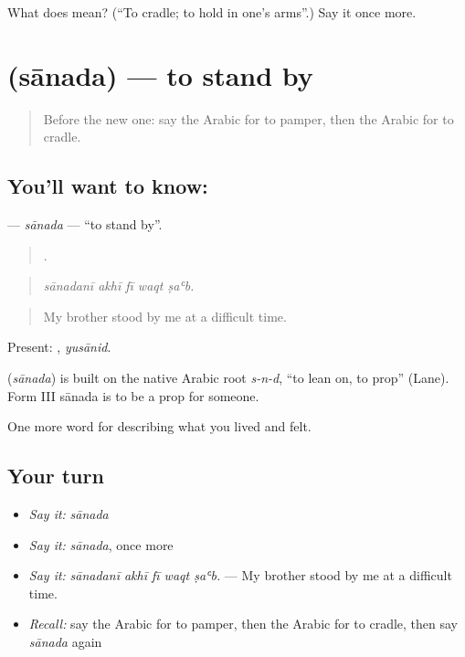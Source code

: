 \begin{tcolorbox}[breakable,colback=teal!4,colframe=teal!35!black,title={Before you move on}]
What does  mean? (\textquotedblleft{}To cradle; to hold in one's arms\textquotedblright{}.) Say it once more.
\end{tcolorbox}
\section[\texorpdfstring{\ar{ساند} (sānada)}{ساند (sānada)}]{ (sānada) — to stand by}

\label{lesson:AR-C533-sanada}



\begin{quote}
Before the new one: say the Arabic for to pamper, then the Arabic for to cradle.
\end{quote}

\subsection*{You'll want to know: }
\textbf{} — \emph{sānada} — \textquotedblleft{}to stand by\textquotedblright{}.

\begin{quote}
    .
\end{quote}

\begin{quote}
\emph{sānadanī akhī fī waqt ṣaʿb.}
\end{quote}

\begin{quote}
My brother stood by me at a difficult time.
\end{quote}

Present: , \emph{yusānid}.

\begin{cousinweb}
\textbf{} (\emph{sānada}) is built on the native Arabic root \emph{s-n-d}, \textquotedblleft{}to lean on, to prop\textquotedblright{} (Lane). Form III sānada is to be a prop for someone.
\end{cousinweb}

\begin{grammarlens}[title={What you've built}]
One more word for describing what you lived and felt.
\end{grammarlens}

\subsection*{Your turn}
\begin{itemize}
\raggedright
  \item \emph{Say it:} \emph{sānada}
  \item \emph{Say it:} \emph{sānada}, once more
  \item \emph{Say it:} \emph{sānadanī akhī fī waqt ṣaʿb.} — My brother stood by me at a difficult time.
  \item \emph{Recall:} say the Arabic for to pamper, then the Arabic for to cradle, then say \emph{sānada} again
\end{itemize}

